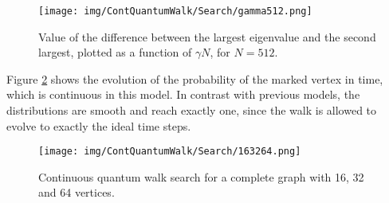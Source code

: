 \documentclass[../../dissertation.tex]{subfiles}
\begin{document}
\begin{figure}[h]
	\centering \texttt{[image: img/ContQuantumWalk/Search/gamma512.png]}
	\caption{Value of the difference between the largest eigenvalue and the second largest, plotted as a function of $\gamma N$, for $N=512$. }\label{fig:ContSearch}
	\label{fig:gamma512}
\end{figure}

Figure \ref{fig:ContSearch} shows the evolution of the probability of the marked vertex in time, which is continuous in this model. In contrast with previous models, the distributions are smooth and reach exactly one, since the walk is allowed to evolve to exactly the ideal time steps.

\begin{figure}[!t]
	\centering \texttt{[image: img/ContQuantumWalk/Search/163264.png]}
	\caption{Continuous quantum walk search for a complete graph with 16, 32 and 64 vertices.}\label{fig:ContSearch}
\end{figure}

\end{document}
